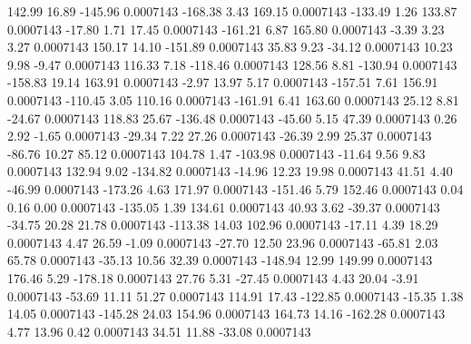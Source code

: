       142.99       16.89     -145.96     0.0007143
     -168.38        3.43      169.15     0.0007143
     -133.49        1.26      133.87     0.0007143
      -17.80        1.71       17.45     0.0007143
     -161.21        6.87      165.80     0.0007143
       -3.39        3.23        3.27     0.0007143
      150.17       14.10     -151.89     0.0007143
       35.83        9.23      -34.12     0.0007143
       10.23        9.98       -9.47     0.0007143
      116.33        7.18     -118.46     0.0007143
      128.56        8.81     -130.94     0.0007143
     -158.83       19.14      163.91     0.0007143
       -2.97       13.97        5.17     0.0007143
     -157.51        7.61      156.91     0.0007143
     -110.45        3.05      110.16     0.0007143
     -161.91        6.41      163.60     0.0007143
       25.12        8.81      -24.67     0.0007143
      118.83       25.67     -136.48     0.0007143
      -45.60        5.15       47.39     0.0007143
        0.26        2.92       -1.65     0.0007143
      -29.34        7.22       27.26     0.0007143
      -26.39        2.99       25.37     0.0007143
      -86.76       10.27       85.12     0.0007143
      104.78        1.47     -103.98     0.0007143
      -11.64        9.56        9.83     0.0007143
      132.94        9.02     -134.82     0.0007143
      -14.96       12.23       19.98     0.0007143
       41.51        4.40      -46.99     0.0007143
     -173.26        4.63      171.97     0.0007143
     -151.46        5.79      152.46     0.0007143
        0.04        0.16        0.00     0.0007143
     -135.05        1.39      134.61     0.0007143
       40.93        3.62      -39.37     0.0007143
      -34.75       20.28       21.78     0.0007143
     -113.38       14.03      102.96     0.0007143
      -17.11        4.39       18.29     0.0007143
        4.47       26.59       -1.09     0.0007143
      -27.70       12.50       23.96     0.0007143
      -65.81        2.03       65.78     0.0007143
      -35.13       10.56       32.39     0.0007143
     -148.94       12.99      149.99     0.0007143
      176.46        5.29     -178.18     0.0007143
       27.76        5.31      -27.45     0.0007143
        4.43       20.04       -3.91     0.0007143
      -53.69       11.11       51.27     0.0007143
      114.91       17.43     -122.85     0.0007143
      -15.35        1.38       14.05     0.0007143
     -145.28       24.03      154.96     0.0007143
      164.73       14.16     -162.28     0.0007143
        4.77       13.96        0.42     0.0007143
       34.51       11.88      -33.08     0.0007143
